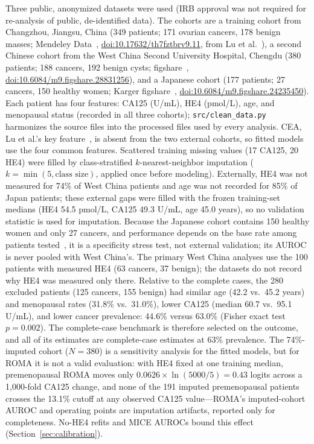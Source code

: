 \documentclass[conference]{IEEEtran}
\begin{document}
Three public, anonymized datasets were used
\cite{dataset1,dataset2,machida2023} (IRB approval was not required
for re-analysis of public, de-identified data). The cohorts are a
training cohort from Changzhou,
Jiangsu, China (349 patients; 171 ovarian cancers, 178 benign masses;
Mendeley Data~\cite{dataset1}, \url{doi:10.17632/th7fztbrv9.11}, from
Lu et al.~\cite{lu2020}), a
second Chinese
cohort from the West China Second University Hospital, Chengdu
(380 patients; 188 cancers, 192 benign cysts;
figshare~\cite{dataset2}, \url{doi:10.6084/m9.figshare.28831256}), and a
Japanese cohort (177 patients; 27
cancers, 150 healthy women; Karger figshare~\cite{machida2023},
\url{doi:10.6084/m9.figshare.24235450}). Each patient has four features:
CA125
(U/mL), HE4 (pmol/L), age, and menopausal status (recorded in all
three cohorts);
\texttt{src/clean\_data.py} harmonizes the source files into the
processed files used by every analysis. CEA, Lu et al.'s key
feature~\cite{lu2020}, is absent from the two external cohorts, so
fitted models use the four common features.
Scattered training missing
values (17 CA125, 20 HE4) were filled by class-stratified
$k$-nearest-neighbor imputation ($k=\min(5,\text{class size})$,
applied once before modeling). Externally, HE4 was not measured for 74\% of West China
patients and age was not recorded for 85\% of Japan patients; these
external gaps were filled with the frozen training-set medians
(HE4 54.5 pmol/L, CA125 49.3 U/mL, age 45.0 years), so no
validation statistic is used for imputation.
Because the Japanese cohort contains 150 healthy women and only 27
cancers, and performance depends on the base rate among
patients tested~\cite{rolfsen2020}, it is a
specificity stress test, not external validation; its AUROC is
never pooled with West China's. The primary
West China analyses use the 100 patients with measured HE4 (63 cancers,
37 benign); the datasets do not record why HE4 was
measured only there. Relative to the
complete cases, the 280 excluded
patients (125 cancers, 155 benign) had similar age (42.2 vs.\
45.2 years) and menopausal rates (31.8\% vs.\ 31.0\%), lower
CA125 (median 60.7 vs.\ 95.1 U/mL), and lower cancer prevalence:
44.6\% versus 63.0\% (Fisher exact test
$p=0.002$). The complete-case benchmark is therefore selected on the
outcome, and all of its estimates are complete-case estimates at 63\%
prevalence. The 74\%-imputed cohort ($N=380$) is a sensitivity
analysis for the fitted models, but for ROMA it is not a valid
evaluation: with HE4
fixed at one training median, premenopausal ROMA moves only
$0.0626\times\ln(5000/5)=0.43$ logits across a 1{,}000-fold CA125
change, and none of the 191 imputed premenopausal patients crosses
the 13.1\% cutoff at any observed CA125 value---ROMA's
imputed-cohort AUROC
and operating points are imputation artifacts, reported only for
completeness. No-HE4 refits and MICE AUROCs
bound this effect (Section~\ref{sec:calibration}).
\end{document}
